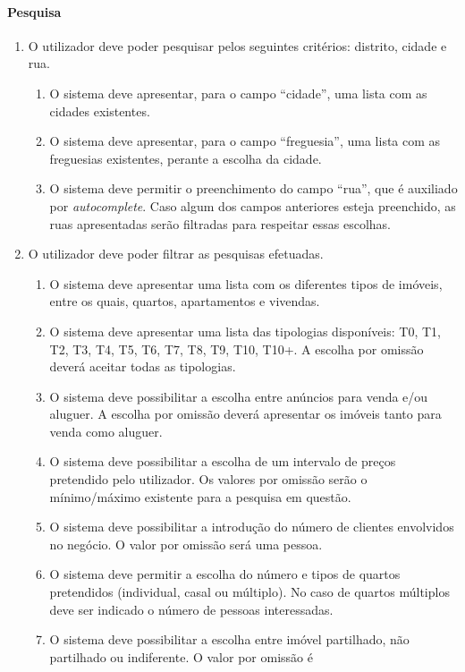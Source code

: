 \paragraph{Pesquisa}\label{pesquisa}
\begin{enumerate}
    \item O utilizador deve poder pesquisar pelos seguintes critérios: distrito, cidade e rua.
    \begin{enumerate}
        \item O sistema deve apresentar, para o campo ``cidade'', uma lista com as cidades existentes.
        \item O sistema deve apresentar, para o campo ``freguesia'', uma lista com as freguesias existentes, perante a escolha da cidade.
        \item O sistema deve permitir o preenchimento do campo ``rua'', que é auxiliado por \textit{autocomplete}. Caso algum dos campos anteriores esteja preenchido, as ruas apresentadas serão filtradas para respeitar essas escolhas.
    \end{enumerate}
    \item O utilizador deve poder filtrar as pesquisas efetuadas.
    \begin{enumerate}
        \item O sistema deve apresentar uma lista com os diferentes tipos de imóveis, entre os quais, quartos, apartamentos e vivendas.
        \item O sistema deve apresentar uma lista das tipologias disponíveis: T0, T1, T2, T3, T4, T5, T6, T7, T8, T9, T10, T10+. A escolha por omissão deverá aceitar todas as tipologias.
        \item O sistema deve possibilitar a escolha entre anúncios para venda e/ou
        aluguer. A escolha por omissão deverá apresentar os imóveis tanto para venda como aluguer.
        \item O sistema deve possibilitar a escolha de um intervalo de preços pretendido pelo utilizador. Os valores por omissão serão o mínimo/máximo existente para a pesquisa em questão.
        \item O sistema deve possibilitar a introdução do número de clientes envolvidos no negócio. O valor por omissão será uma pessoa.
        \item O sistema deve permitir a escolha do número e tipos de quartos pretendidos (individual, casal ou múltiplo). No caso de quartos múltiplos deve ser indicado o número de pessoas interessadas.
        \item O sistema deve possibilitar a escolha entre imóvel partilhado, não partilhado ou indiferente. O valor por omissão é

\end{enumerate}
\end{enumerate}
